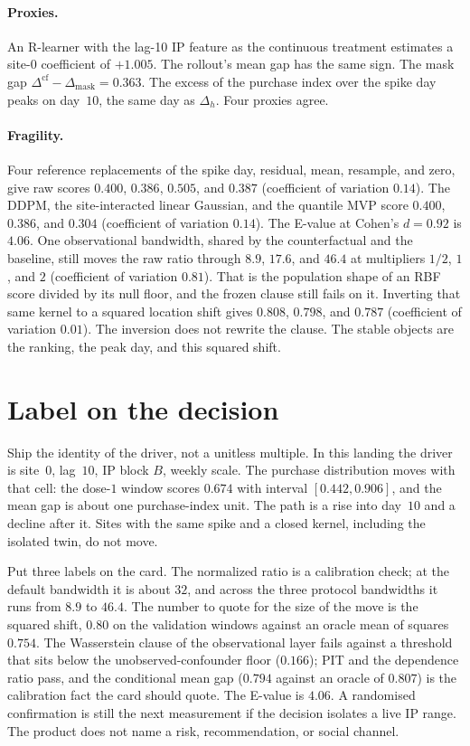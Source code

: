 \documentclass[11pt]{article}
\begin{document}
\paragraph{Proxies.}
An R-learner \citep{nie2021quasi} with the lag-10 IP feature as the continuous treatment estimates a site-0 coefficient of $+1.005$.
The rollout's mean gap has the same sign.
The mask gap $\Delta^{\mathrm{cf}}-\Delta_{\mathrm{mask}}=0.363$.
The excess of the purchase index over the spike day peaks on day~$10$, the same day as $\Delta_h$.
Four proxies agree.

\paragraph{Fragility.}
Four reference replacements of the spike day, residual, mean, resample, and zero, give raw scores $0.400$, $0.386$, $0.505$, and $0.387$ (coefficient of variation $0.14$).
The DDPM, the site-interacted linear Gaussian, and the quantile MVP score $0.400$, $0.386$, and $0.304$ (coefficient of variation $0.14$).
The E-value \citep{vanderweele2017sensitivity} at Cohen's $d=0.92$ is $4.06$.
One observational bandwidth, shared by the counterfactual and the baseline, still moves the raw ratio through $8.9$, $17.6$, and $46.4$ at multipliers $1/2$, $1$, and $2$ (coefficient of variation $0.81$).
That is the population shape of an RBF score divided by its null floor, and the frozen clause still fails on it.
Inverting that same kernel to a squared location shift gives $0.808$, $0.798$, and $0.787$ (coefficient of variation $0.01$).
The inversion does not rewrite the clause.
The stable objects are the ranking, the peak day, and this squared shift.

\section{Label on the decision}
\label{sec:label}

Ship the identity of the driver, not a unitless multiple.
In this landing the driver is site~0, lag~$10$, IP block $B$, weekly scale.
The purchase distribution moves with that cell: the dose-$1$ window scores $0.674$ with interval $[0.442,0.906]$, and the mean gap is about one purchase-index unit.
The path is a rise into day~$10$ and a decline after it.
Sites with the same spike and a closed kernel, including the isolated twin, do not move.

Put three labels on the card.
The normalized ratio is a calibration check; at the default bandwidth it is about $32$, and across the three protocol bandwidths it runs from $8.9$ to $46.4$.
The number to quote for the size of the move is the squared shift, $0.80$ on the validation windows against an oracle mean of squares $0.754$.
The Wasserstein clause of the observational layer fails against a threshold that sits below the unobserved-confounder floor ($0.166$); PIT and the dependence ratio pass, and the conditional mean gap ($0.794$ against an oracle of $0.807$) is the calibration fact the card should quote.
The E-value is $4.06$.
A randomised confirmation is still the next measurement if the decision isolates a live IP range.
The product does not name a risk, recommendation, or social channel.



\end{document}
